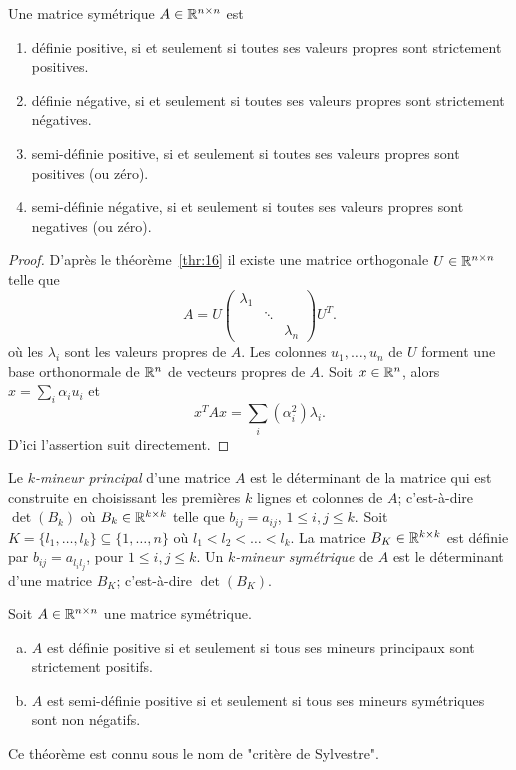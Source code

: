 \begin{theorem}
  \label{thr:15}
  Une matrice symétrique $A \in \mathbb{R}^{n \times n}$ est 
  \begin{enumerate}
  \item définie positive,
    si et seulement si toutes ses valeurs propres sont strictement positives. 
  \item définie négative, si et seulement si toutes ses valeurs propres sont strictement négatives. 
  \item semi-définie positive, si et seulement si toutes ses valeurs propres sont positives (ou zéro).  
  \item semi-définie négative, si et seulement si toutes ses valeurs propres sont negatives (ou zéro).  
  \end{enumerate}
\end{theorem}

\begin{proof}
  D'après le théorème~\ref{thr:16} il existe une 
  matrice orthogonale $U \in \mathbb{R}^{n\times n}$ telle que 
  \begin{equation}
    \label{eq:10}    
    A = U
    \begin{pmatrix}
      \lambda_1 \\
      & \ddots \\
      && \lambda_n
    \end{pmatrix} U^T. 
  \end{equation}
  où les $\lambda_i$ sont les valeurs propres de $A$. Les colonnes  $u_1,\dots,u_n$ de $U$ forment une base orthonormale de $\mathbb{R}^n$  de vecteurs propres de $A$. 
  Soit $x \in \mathbb{R}^n$, alors $x = \sum_i \alpha_i u_i$ et 
  \begin{displaymath}
    x^TAx = \sum_i (\alpha_i^2) \lambda_i.  
  \end{displaymath}
D'ici l'assertion suit directement. 
\end{proof}

Le \emph{$k$-mineur principal} d'une matrice $A$ est le déterminant de la matrice qui est construite en choisissant les premières $k$ lignes et colonnes de $A$; c'est-à-dire $\det(B_k)$ où $B_k \in \mathbb{R}^{k\times k}$ telle que $b_{ij} = a_{ij}$, $1 \leq i,j \leq k$. Soit $K  = \{l_1,\dots,l_k\}\subseteq \{1,\dots,n\}$ où $l_1<l_2<\dots<l_k$. 
La matrice $B_K \in \mathbb{R}^{k\times k}$  est définie par $b_{ij} = a_{l_il_j}$, pour $1 \leq i,j\leq k$. Un \emph{$k$-mineur symétrique} de $A$ est le déterminant d'une matrice $B_K$; c'est-à-dire $\det(B_K)$.  

\begin{theorem}
  \label{thr:17}
  Soit $A \in  \mathbb{R}^{n \times n}$ une matrice symétrique.   
  \begin{enumerate}[a)]
  \item $A$ \label{posdef:1}
    est définie positive si et seulement si tous ses mineurs
    principaux sont strictement positifs.
  \item $A$ \label{posdef:2}
    est semi-définie positive si et seulement si tous ses mineurs symétriques sont non
    négatifs.
  \end{enumerate}
  Ce théorème est connu sous le nom de "critère de Sylvestre".
\end{theorem}


